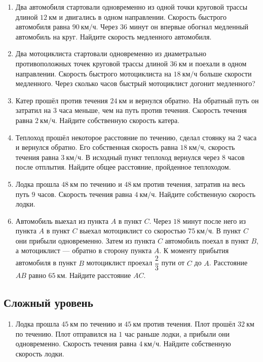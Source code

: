 \documentclass[a4paper,12pt]{article}
\newcommand{\kmh}{\text{км/ч}}
\newcommand{\km}{\text{км}}
\begin{document}
\begin{enumerate}[resume]
    \item Два автомобиля стартовали одновременно из одной точки круговой трассы длиной $12\ \km$ и двигались в одном направлении. Скорость быстрого автомобиля равна $90\ \kmh$. Через $36$ минут он впервые обогнал медленный автомобиль на круг. Найдите скорость медленного автомобиля.

    \item Два мотоциклиста стартовали одновременно из диаметрально противоположных точек круговой трассы длиной $36\ \km$ и поехали в одном направлении. Скорость быстрого мотоциклиста на $18\ \kmh$ больше скорости медленного. Через сколько часов быстрый мотоциклист догонит медленного?

    \item Катер прошёл против течения $24\ \km$ и вернулся обратно. На обратный путь он затратил на $3$ часа меньше, чем на путь против течения. Скорость течения равна $2\ \kmh$. Найдите собственную скорость катера.

    \item Теплоход прошёл некоторое расстояние по течению, сделал стоянку на $2$ часа и вернулся обратно. Его собственная скорость равна $18\ \kmh$, скорость течения равна $3\ \kmh$. В исходный пункт теплоход вернулся через $8$ часов после отплытия. Найдите общее расстояние, пройденное теплоходом.

    \item Лодка прошла $48\ \km$ по течению и $48\ \km$ против течения, затратив на весь путь $9$ часов. Скорость течения равна $4\ \kmh$. Найдите собственную скорость лодки.

    \item Автомобиль выехал из пункта $A$ в пункт $C$. Через $18$ минут после него из пункта $A$ в пункт $C$ выехал мотоциклист со скоростью $75\ \kmh$. В пункт $C$ они прибыли одновременно. Затем из пункта $C$ автомобиль поехал в пункт $B$, а мотоциклист --- обратно в сторону пункта $A$. К моменту прибытия автомобиля в пункт $B$ мотоциклист проехал $\dfrac{2}{3}$ пути от $C$ до $A$. Расстояние $AB$ равно $65\ \km$. Найдите расстояние $AC$.
\end{enumerate}

\subsection*{Сложный уровень}

\begin{enumerate}[resume]
    \item Лодка прошла $45\ \km$ по течению и $45\ \km$ против течения. Плот прошёл $32\ \km$ по течению. Плот отправился на $1$ час раньше лодки, а прибыли они одновременно. Скорость течения равна $4\ \kmh$. Найдите собственную скорость лодки.
\end{enumerate}
\end{document}
